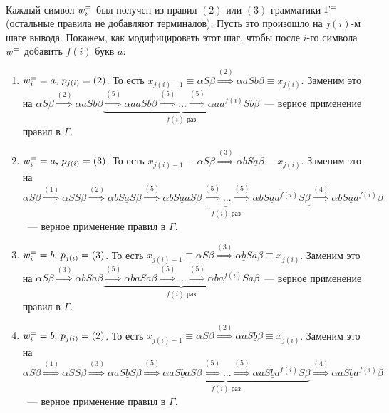 \documentclass[a4paper]{article}
\begin{document}
\begin{itemize}
\\[5pt]
Каждый символ $w^=_i$ был получен из правил $(2)$ или $(3)$ грамматики $\Gamma^=$ (остальные правила не добавляют терминалов). Пусть это произошло на $j(i)$-м шаге вывода. Покажем, как модифицировать этот шаг, чтобы после $i$-го символа $w^=$ добавить $f(i)$ букв $a$:\begin{enumerate}
\item $w^=_i=a,\,p_{j(i)}=(2)$. То есть $x_{j(i)-1}\equiv\alpha S\beta\overset{(2)}{\Longrightarrow}\alpha \underline{a}Sb\beta\equiv x_{j(i)}$. Заменим это на\newline
$\alpha S\beta\overset{(2)}{\Longrightarrow}\alpha \underline{a}Sb\beta\underbrace{\overset{(5)}{\Longrightarrow}\alpha \underline{a}aSb\beta\overset{(5)}{\Longrightarrow}...\overset{(5)}{\Longrightarrow}\alpha \underline{a}a^{f(i)}Sb\beta}_{f(i)\mbox{ раз}}$~--- верное применение правил в $\Gamma$.
\item $w^=_i=a,\,p_{j(i)}=(3)$. То есть $x_{j(i)-1}\equiv\alpha S\beta\overset{(3)}{\Longrightarrow}\alpha  bS\underline{a}\beta\equiv x_{j(i)}$. Заменим это на\newline
$\alpha S\beta\overset{(1)}{\Longrightarrow}\alpha SS\beta\overset{(2)}{\Longrightarrow}\alpha bS\underline{a}S\beta\underbrace{\overset{(5)}{\Longrightarrow}\alpha bS\underline{a}aS\beta\overset{(5)}{\Longrightarrow}...\overset{(5)}{\Longrightarrow}\alpha bS\underline{a}a^{f(i)}S\beta}_{f(i)\mbox{ раз}}\overset{(4)}{\Longrightarrow}\alpha bS\underline{a}a^{f(i)}\beta$~--- верное применение правил в $\Gamma$.
\item $w^=_i=b,\,p_{j(i)}=(3)$. То есть $x_{j(i)-1}\equiv\alpha S\beta\overset{(3)}{\Longrightarrow}\alpha \underline{b}Sa\beta\equiv x_{j(i)}$. Заменим это на\newline
$\alpha S\beta\overset{(3)}{\Longrightarrow}\alpha \underline{b}Sa\beta\underbrace{\overset{(5)}{\Longrightarrow}\alpha \underline{b}aSa\beta\overset{(5)}{\Longrightarrow}...\overset{(5)}{\Longrightarrow}\alpha \underline{b}a^{f(i)}Sa\beta}_{f(i)\mbox{ раз}}$~--- верное применение правил в $\Gamma$.
\item $w^=_i=b,\,p_{j(i)}=(2)$. То есть $x_{j(i)-1}\equiv\alpha S\beta\overset{(2)}{\Longrightarrow}\alpha  aS\underline{b}\beta\equiv x_{j(i)}$. Заменим это на\newline
$\alpha S\beta\overset{(1)}{\Longrightarrow}\alpha SS\beta\overset{(3)}{\Longrightarrow}\alpha aS\underline{b}S\beta\underbrace{\overset{(5)}{\Longrightarrow}\alpha aS\underline{b}aS\beta\overset{(5)}{\Longrightarrow}...\overset{(5)}{\Longrightarrow}\alpha aS\underline{b}a^{f(i)}S\beta}_{f(i)\mbox{ раз}}\overset{(4)}{\Longrightarrow}\alpha aS\underline{b}a^{f(i)}\beta$~--- верное применение правил в $\Gamma$.

\end{enumerate}
\end{itemize}
\end{document}
